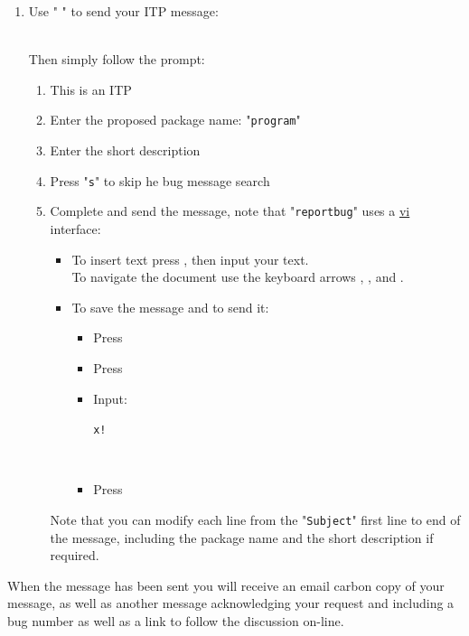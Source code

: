 \begin{enumerate}
{{\begin{scriptii}
\end{scriptii}
}}
\item Use " " to send your ITP message:
{\footnotesize{
\begin{scripti}
\uprompt{~}  
\end{scripti}
}}
\\[-0.75cm]
\noindent Then simply follow the prompt: 
\begin{enumerate}
\item This is an ITP
\item Enter the proposed package name: "\texttt{program}"
\item Enter the short description 
\item Press "\texttt{s}" to skip he bug message search
\item Complete and send the message, note that "\texttt{reportbug}" uses a \href{https://www.vim.org}{vi} interface:
\begin{itemize}
\item To insert text press , then input your text. \\
To navigate the document use the keyboard arrows \LArrow, \RArrow, \UArrow and \DArrow.
\item To save the message and to send it:
\begin{itemize}
\item Press \Esc
\item Press \keystroke{:}
\item Input: \\[-1cm]
\begin{scriptiii}
\texttt{x!}
\end{scriptiii}
\\[-1.5cm]
\item Press \Enter
\end{itemize}
\end{itemize}
Note that you can modify each line from the "\texttt{Subject}" first line to end of the message, 
including the package name and the short description if required.
\end{enumerate}
\end{enumerate}
When the message has been sent you will receive an email carbon copy of your message, as well as another message acknowledging your request and including a bug number as well as a link to follow the discussion on-line. \\
